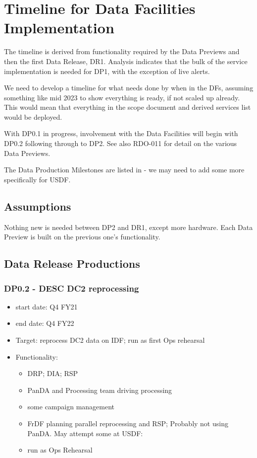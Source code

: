 
\section{Timeline for Data Facilities Implementation}\label{sec:timeline}

The timeline is derived from functionality required by the Data
Previews and then the first Data Release, DR1. Analysis indicates that
the bulk of the service implementation is needed for DP1, with the
exception of live alerts. 

We need to develop a timeline for what needs done by when in the DFs, assuming something like mid 2023 to show everything is ready, if not scaled up already.
This would mean that everything in the scope document and derived services list would be deployed.

With DP0.1 in progress, involvement with the Data Facilities will
begin with DP0.2  following through to \gls{DP2}.
See also RDO-011 for detail on the various Data Previews.

The Data Production Milestones are listed in  - we may need to add some more specifically for \gls{USDF}.


\subsection{Assumptions}

Nothing new is needed between \gls{DP2} and DR1, except more
hardware. Each Data Preview is built on the previous one's functionality.

\subsection{Data \gls{Release} Productions}
\subsubsection{ DP0.2 - \gls{DESC} DC2 reprocessing}
\begin{itemize}
\item start date: Q4 \gls{FY21}
\item end date: Q4 FY22
\item Target: reprocess \gls{DC2} data on IDF; run as first Ops rehearsal
\item Functionality:
\begin{itemize}
\item \gls{DRP}; \gls{DIA}; RSP
\item \gls{PanDA} and Processing team driving processing
\item some campaign management
\item FrDF planning parallel reprocessing and RSP; Probably not using
  PanDA. May attempt some at \gls{USDF}:
\item run as Ops Rehearsal
\end{itemize}
\end{itemize}
